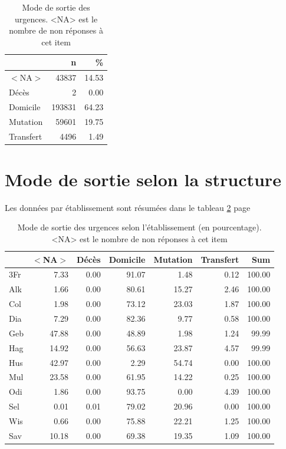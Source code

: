 \documentclass[12pt,english,french,twoside]{report}\usepackage[]{graphicx}\usepackage[]{color}
\begin{document}
\begin{table}[ht]
\centering
\begin{tabular}{|l|r|r|}
  \hline
 & n & \% \\ 
  \hline
$<$NA$>$ & 43837 & 14.53 \\ 
  Décès & 2 & 0.00 \\ 
  Domicile & 193831 & 64.23 \\ 
  Mutation & 59601 & 19.75 \\ 
  Transfert & 4496 & 1.49 \\ 
   \hline
\end{tabular}
\caption[Mode de sortie des urgences]{Mode de sortie des urgences. <NA> est le nombre de non réponses à cet item} 
\label{tab.sortie}
\end{table}



\section{Mode de sortie selon la structure}

Les données par établissement sont résumées dans le tableau \ref{tab.sortie_etab} page \pageref{tab.sortie_etab}

\begin{table}[ht]
\centering
\begin{tabular}{|l|r|r|r|r|r|r|}
  \hline
 & $<$NA$>$ & Décès & Domicile & Mutation & Transfert & Sum \\ 
  \hline
3Fr & 7.33 & 0.00 & 91.07 & 1.48 & 0.12 & 100.00 \\ 
  Alk & 1.66 & 0.00 & 80.61 & 15.27 & 2.46 & 100.00 \\ 
  Col & 1.98 & 0.00 & 73.12 & 23.03 & 1.87 & 100.00 \\ 
  Dia & 7.29 & 0.00 & 82.36 & 9.77 & 0.58 & 100.00 \\ 
  Geb & 47.88 & 0.00 & 48.89 & 1.98 & 1.24 & 99.99 \\ 
  Hag & 14.92 & 0.00 & 56.63 & 23.87 & 4.57 & 99.99 \\ 
  Hus & 42.97 & 0.00 & 2.29 & 54.74 & 0.00 & 100.00 \\ 
  Mul & 23.58 & 0.00 & 61.95 & 14.22 & 0.25 & 100.00 \\ 
  Odi & 1.86 & 0.00 & 93.75 & 0.00 & 4.39 & 100.00 \\ 
  Sel & 0.01 & 0.01 & 79.02 & 20.96 & 0.00 & 100.00 \\ 
  Wis & 0.66 & 0.00 & 75.88 & 22.21 & 1.25 & 100.00 \\ 
  Sav & 10.18 & 0.00 & 69.38 & 19.35 & 1.09 & 100.00 \\ 
   \hline
\end{tabular}
\caption[Mode de sortie selon l'établissement]{Mode de sortie des urgences selon l'établissement (en pourcentage). <NA> est le nombre de non réponses à cet item} 
\label{tab.sortie_etab}
\end{table}
\end{document}
